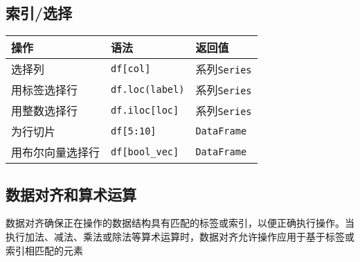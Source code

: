 \documentclass[11pt]{ctexart}
\begin{document}
    \hypertarget{ux7d22ux5f15ux9009ux62e9}{%
\subsection{索引/选择}\label{ux7d22ux5f15ux9009ux62e9}}

\begin{longtable}[]{@{}lll@{}}
\toprule\noalign{}
操作 & 语法 & 返回值 \\
\midrule\noalign{}
\endhead
\bottomrule\noalign{}
\endlastfoot
选择列 & \texttt{df{[}col{]}} & 系列\texttt{Series} \\
用标签选择行 & \texttt{df.loc(label)} & 系列\texttt{Series} \\
用整数选择行 & \texttt{df.iloc{[}loc{]}} & 系列\texttt{Series} \\
为行切片 & \texttt{df{[}5:10{]}} & \texttt{DataFrame} \\
用布尔向量选择行 & \texttt{df{[}bool\_vec{]}} & \texttt{DataFrame} \\
\end{longtable}

    \hypertarget{ux6570ux636eux5bf9ux9f50ux548cux7b97ux672fux8fd0ux7b97}{%
\subsection{数据对齐和算术运算}\label{ux6570ux636eux5bf9ux9f50ux548cux7b97ux672fux8fd0ux7b97}}

数据对齐确保正在操作的数据结构具有匹配的标签或索引，以便正确执行操作。当执行加法、减法、乘法或除法等算术运算时，数据对齐允许操作应用于基于标签或索引相匹配的元素
\end{document}
